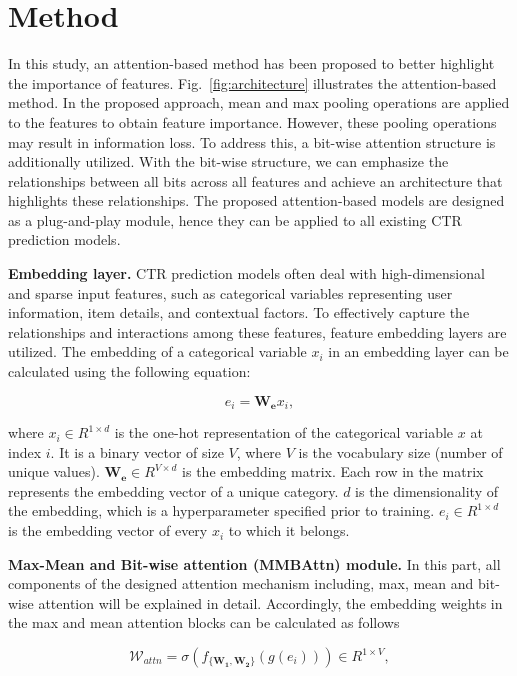 \documentclass{article}
\begin{document}
\section{Method}
In this study, an attention-based method has been proposed to better highlight the importance of features. Fig.~\ref{fig:architecture} illustrates the attention-based method. In the proposed approach, mean and max pooling operations are applied to the features to obtain feature importance. However, these pooling operations may result in information loss. To address this, a bit-wise attention structure is additionally utilized. With the bit-wise structure, we can emphasize the relationships between all bits across all features and achieve an architecture that highlights these relationships. The proposed attention-based models are designed as a plug-and-play module, hence they can be applied to all existing CTR prediction models.



\noindent\textbf{Embedding layer.} CTR prediction models often deal with high-dimensional and sparse input features, such as categorical variables representing user information, item details, and contextual factors. To effectively capture the relationships and interactions among these features, feature embedding layers are utilized. The embedding of a categorical variable $x_i$ in an embedding layer can be calculated using the following equation:

\begin{equation}
e_i = \boldsymbol{W_e}x_i,
\end{equation}

\noindent where $x_i \in R^{1\times d}$ is the one-hot representation of the categorical variable $x$ at index $i$. It is a binary vector of size $V$, where $V$ is the vocabulary size (number of unique values).
$\boldsymbol{W_e} \in R^{V\times d} $ is the embedding matrix. Each row in the matrix represents the embedding vector of a unique category. $d$ is the dimensionality of the embedding, which is a hyperparameter specified prior to training. $e_i \in R^{1\times d}$ is the embedding vector of every $x_i$ to which it belongs.


\noindent\textbf{Max-Mean and Bit-wise attention (MMBAttn) module.} In this part, all components of the designed attention mechanism including, max, mean and bit-wise attention will be explained in detail.
Accordingly, the embedding weights in the max and mean attention blocks can be calculated as follows


\begin{equation}
\mathcal{W}_{attn} = \sigma(f_{\{\boldsymbol{W_1}, \boldsymbol{W_2}\}}(g(e_{i}))) \in R^{1\times V},
\end{equation}
\end{document}

